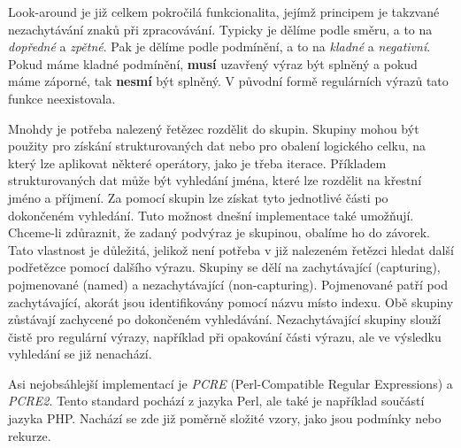Look-around je již celkem pokročilá funkcionalita, jejímž principem je takzvané nezachytávání znaků při zpracovávání.
Typicky je dělíme podle směru, a to na \textit{dopředné} a \textit{zpětné}.
Pak je dělíme podle podmínění, a to na \textit{kladné} a \textit{negativní}.
Pokud máme kladné podmínění, \textbf{musí} uzavřený výraz být splněný a pokud máme záporné, tak \textbf{nesmí} být splněný.
V původní formě regulárních výrazů tato funkce neexistovala.

Mnohdy je potřeba nalezený řetězec rozdělit do skupin.
Skupiny mohou být použity pro získání strukturovaných dat nebo pro obalení logického celku, na který lze aplikovat některé operátory, jako je třeba iterace.
Příkladem strukturovaných dat může být vyhledání jména, které lze rozdělit na křestní jméno a příjmení.
Za pomocí skupin lze získat tyto jednotlivé části po dokončeném vyhledání. 
Tuto možnost dnešní implementace také umožňují.
Chceme-li zdůraznit, že zadaný podvýraz je skupinou, obalíme ho do závorek.
Tato vlastnost je důležitá, jelikož není potřeba v již nalezeném řetězci hledat další podřetězce pomocí dalšího výrazu.
Skupiny se dělí na zachytávající (capturing), pojmenované (named) a nezachytávající (non-capturing).
Pojmenované patří pod zachytávající, akorát jsou identifikovány pomocí názvu místo indexu.
Obě skupiny zůstávají zachycené po dokončeném vyhledávání.
Nezachytávající skupiny slouží čistě pro regulární výrazy, například při opakování části výrazu, ale ve výsledku vyhledání se již nenachází.

Asi nejobsáhlejší implementací je \textit{PCRE} (Perl-Compatible Regular Expressions) a \textit{PCRE2}.
Tento standard pochází z jazyka Perl, ale také je například součástí jazyka PHP.
Nachází se zde již poměrně složité vzory, jako jsou podmínky nebo rekurze.

\endinput
